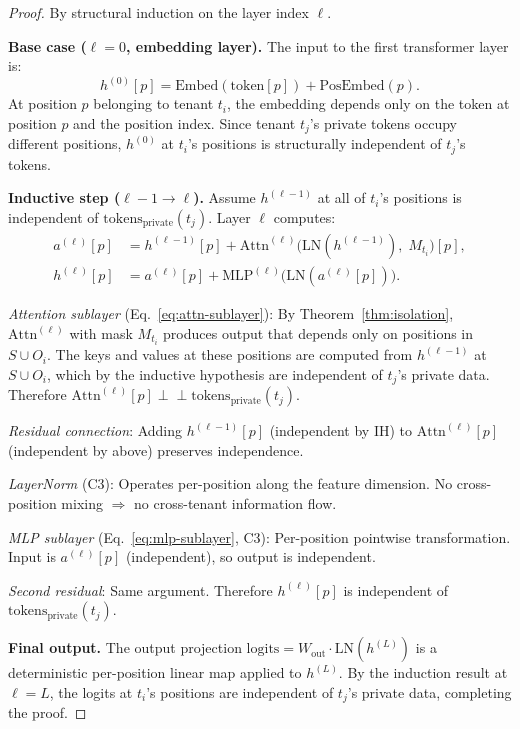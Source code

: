 \begin{proof}
By structural induction on the layer index $\ell$.

\medskip\noindent
\textbf{Base case ($\ell = 0$, embedding layer).}
The input to the first transformer layer is:
\begin{equation}
    h^{(0)}[p] = \mathrm{Embed}(\mathrm{token}[p]) + \mathrm{PosEmbed}(p).
\end{equation}
At position $p$ belonging to tenant $t_i$, the embedding depends only on the
token at position $p$ and the position index.  Since tenant $t_j$'s private
tokens occupy different positions, $h^{(0)}$ at $t_i$'s positions is structurally
independent of $t_j$'s tokens.

\medskip\noindent
\textbf{Inductive step ($\ell - 1 \to \ell$).}
Assume $h^{(\ell-1)}$ at all of $t_i$'s positions is independent of
$\mathrm{tokens}_{\mathrm{private}}(t_j)$.  Layer $\ell$ computes:
\begin{align}
    a^{(\ell)}[p] &= h^{(\ell-1)}[p] + \mathrm{Attn}^{(\ell)}\!\big(\mathrm{LN}(h^{(\ell-1)}),\; M_{t_i}\big)[p], \label{eq:attn-sublayer}\\
    h^{(\ell)}[p] &= a^{(\ell)}[p] + \mathrm{MLP}^{(\ell)}\!\big(\mathrm{LN}(a^{(\ell)}[p])\big). \label{eq:mlp-sublayer}
\end{align}

\noindent\emph{Attention sublayer} (Eq.~\ref{eq:attn-sublayer}):
By Theorem~\ref{thm:isolation}, $\mathrm{Attn}^{(\ell)}$ with mask $M_{t_i}$ produces
output that depends only on positions in $S \cup O_i$.  The keys and values at these
positions are computed from $h^{(\ell-1)}$ at $S \cup O_i$, which by the inductive
hypothesis are independent of $t_j$'s private data.  Therefore
$\mathrm{Attn}^{(\ell)}[p] \perp\!\!\!\perp \mathrm{tokens}_{\mathrm{private}}(t_j)$.

\noindent\emph{Residual connection}: Adding $h^{(\ell-1)}[p]$ (independent by IH)
to $\mathrm{Attn}^{(\ell)}[p]$ (independent by above) preserves independence.

\noindent\emph{LayerNorm} (C3): Operates per-position along the feature dimension.
No cross-position mixing $\Rightarrow$ no cross-tenant information flow.

\noindent\emph{MLP sublayer} (Eq.~\ref{eq:mlp-sublayer}, C3):
Per-position pointwise transformation.  Input is $a^{(\ell)}[p]$ (independent),
so output is independent.

\noindent\emph{Second residual}: Same argument. Therefore $h^{(\ell)}[p]$
is independent of $\mathrm{tokens}_{\mathrm{private}}(t_j)$.

\medskip\noindent
\textbf{Final output.}
The output projection $\mathrm{logits} = W_{\mathrm{out}} \cdot \mathrm{LN}(h^{(L)})$
is a deterministic per-position linear map applied to $h^{(L)}$.
By the induction result at $\ell = L$, the logits at $t_i$'s positions are
independent of $t_j$'s private data, completing the proof.
\end{proof}

